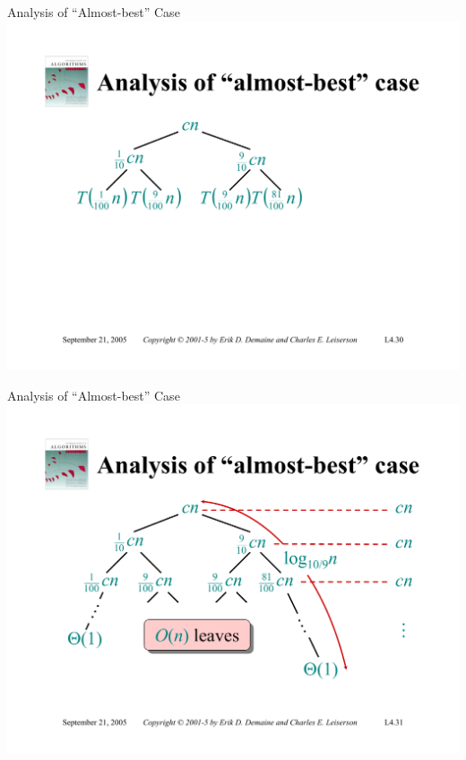 \documentclass{beamer}
\begin{document}
\begin{frame}{Analysis of ``Almost-best'' Case}
    \centering
    \includegraphics[width=\textwidth, trim={1.00cm 1.50cm 1.00cm 4.25cm}, clip]{pages/lec4_30}
\end{frame}
\begin{frame}{Analysis of ``Almost-best'' Case}
    \centering
    \includegraphics[width=\textwidth, trim={1.00cm 1.50cm 1.00cm 4.25cm}, clip]{pages/lec4_31}
\end{frame}
\end{document}
